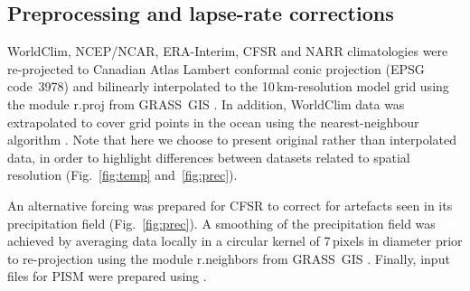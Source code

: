 
\subsection{Preprocessing and lapse-rate corrections}

WorldClim, NCEP/NCAR, ERA-Interim, CFSR and NARR climatologies were re-projected to Canadian Atlas Lambert conformal conic projection (EPSG code~3978) and bilinearly interpolated to the 10\,km-resolution model grid using the module r.proj from GRASS~GIS \citep{soft:grass}. In addition, WorldClim data was extrapolated to cover grid points in the ocean using the nearest-neighbour algorithm \citep{soft:scipy}. Note that here we choose to present original rather than interpolated data, in order to highlight differences between datasets related to spatial resolution (Fig.~\ref{fig:temp} and~\ref{fig:prec}).

An alternative forcing was prepared for CFSR to correct for artefacts seen in its precipitation field (Fig.~\ref{fig:prec}). A smoothing of the precipitation field was achieved by averaging data locally in a circular kernel of 7\,pixels in diameter prior to re-projection using the module r.neighbors from GRASS~GIS \citep{soft:grass}. Finally, input files for PISM were prepared using \citet{web:nc4py}.
